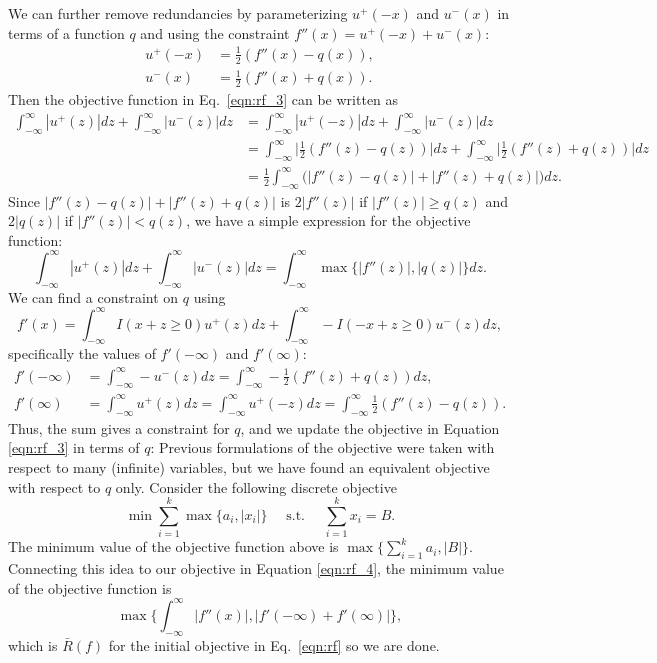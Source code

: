 We can further remove redundancies by parameterizing $u^+(-x)$ and $u^-(x)$ in terms of a function $q$ and using the constraint $f''(x) = u^+(-x) + u^-(x)$:
\[
\begin{split}
u^+(-x) &= \frac{1}{2}(f''(x) - q(x)), \\
u^-(x) &= \frac{1}{2}(f''(x) + q(x)).
\end{split}
\]
Then the objective function in Eq.~\eqref{eqn:rf_3} can be written as
\[
\begin{split}
\int_{-\infty}^{\infty} |u^+(z)| dz + \int_{-\infty}^{\infty} |u^-(z)| dz &= \int_{-\infty}^{\infty} |u^+(-z)| dz + \int_{-\infty}^{\infty} |u^-(z)| dz \\
&= \int_{-\infty}^{\infty} \Big|\frac{1}{2}(f''(z) - q(z))\Big| dz + \int_{-\infty}^{\infty} \Big|\frac{1}{2}(f''(z) + q(z))\Big| dz \\
&= \frac{1}{2} \int_{-\infty}^\infty \Big(|f''(z)-q(z)| + |f''(z)+q(z)|\Big) dz.
\end{split}
\]
Since $|f''(z)-q(z)| + |f''(z)+q(z)|$ is $2|f''(z)|$ if $|f''(z)| \ge q(z)$ and $2|q(z)|$ if $|f''(z)| < q(z)$, we have a simple expression for the objective function:
\[
\int_{-\infty}^{\infty} |u^+(z)| dz + \int_{-\infty}^{\infty} |u^-(z)| dz = \int_{-\infty}^\infty \max\{|f''(z)|, |q(z)|\} dz.
\]
We can find a constraint on $q$ using
\[
f'(x) = \int_{-\infty}^{\infty} I(x+z \ge 0) u^+(z) dz + \int_{-\infty}^{\infty} -I(-x+z \ge 0) u^-(z) dz,
\]
specifically the values of $f'(-\infty)$ and $f'(\infty)$:
\[
\begin{split}
f'(-\infty) &= \int_{-\infty}^{\infty} -u^-(z) dz = \int_{-\infty}^{\infty} -\frac{1}{2}(f''(z) + q(z)) dz, \\
f'(\infty) &= \int_{-\infty}^{\infty} u^+(z) dz = \int_{-\infty}^{\infty} u^+(-z) dz = \int_{-\infty}^{\infty} \frac{1}{2}(f''(z) - q(z)).
\end{split}
\]
Thus, the sum
gives a constraint for $q$, and we update the objective in Equation \ref{eqn:rf_3} in terms of $q$:
Previous formulations of the objective were taken with respect to many (infinite) variables, but we have found an equivalent objective with respect to $q$ only. Consider the following discrete objective
\[
\min \sum_{i=1}^k \max\{a_i, |x_i|\} \quad \text{ s.t. } \quad \sum_{i=1}^k x_i = B.
\]
The minimum value of the objective function above is $\max\{\sum_{i=1}^k a_i, |B|\}$. Connecting this idea to our objective in Equation \ref{eqn:rf_4}, the minimum value of the objective function is 
\[
\max\bigg\{\int_{-\infty}^\infty |f''(x)|, |f'(-\infty) + f'(\infty)|\bigg\},
\]
which is $\bar{R}(f)$ for the initial objective in Eq.~\eqref{eqn:rf} so we are done.

